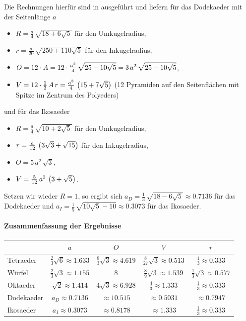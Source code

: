 \documentclass[11pt]{article}
\begin{document}
Die Rechnungen hierfür sind in \cite{Fendt1, Fendt2} ausgeführt und liefern
für das Dodekaeder mit der Seitenlänge $a$
\begin{itemize}
\item $R=\frac{a}{4}\,\sqrt{18+6\sqrt{5}}$ für den Umkugelradius,
\item $r=\frac{a}{20}\,\sqrt{250+110\sqrt{5}}$ für den Inkugelradius,
\item $O=12\cdot A=12\cdot\frac{a^2}{4}\,\sqrt{25+10\sqrt{5}}
  =3\,a^2\,\sqrt{25+10\sqrt{5}}$,
\item $V=12\cdot\frac13\,A\,r =\frac{a^3}{4}\,\left(15+7\sqrt{5}\right)$ (12 Pyramiden
  auf den Seitenflächen mit Spitze im Zentrum des Polyeders)
\end{itemize}
und für das Ikosaeder
\begin{itemize}
\item $R=\frac{a}{4}\,\sqrt{10+2\sqrt{5}}$ für den Umkugelradius,
\item $r=\frac{a}{12}\,\left(3\sqrt{3}+\sqrt{15}\right)$ für den Inkugelradius,
\item $O=5\,a^2\,\sqrt{3}$,
\item $V=\frac{5}{12}\,a^3\,\left(3+\sqrt{5}\right)$.
\end{itemize}
Setzen wir wieder $R=1$, so ergibt sich $a_D=\frac13\,\sqrt{18-6\sqrt{5}}
\approx 0.7136$ für das Dodekaeder und $a_I=\frac15\,\sqrt{10\sqrt{5}-10}
\approx 0.3073$ für das Ikosaeder. 

\paragraph{Zusammenfassung der Ergebnisse}
\begin{center}
  \begin{tabular}{|l|c|c|c|c|}\hline
    & $a$ & $O$ & $V$ & $r$ \\\hline
    Tetraeder & $\frac23\sqrt{6}\approx 1.633$ & $\frac83\sqrt{3} \approx
    4.619$ & $\frac{8}{27}\sqrt{3} \approx 0.513$ & $\frac13 \approx 0.333$\\ 
    Würfel & $\frac23\sqrt{3}\approx 1.155$ & $8$ & $\frac{8}{9}\sqrt{3}
    \approx 1.539$ & $\frac13\sqrt{3} \approx 0.577$ \\
    Oktaeder & $\sqrt{2}\approx 1.414$ & $4\sqrt{3}\approx 6.928$ &
    $\frac43 \approx 1.333$ & $\frac13 \approx 0.333$ \\
    Dodekaeder & $a_D\approx 0.7136$ & $\approx 10.515$ &
    $\approx 0.5031$ & $\approx 0.7947$ \\
    Ikosaeder & $a_I\approx 0.3073$ & $\approx 0.8178$ &
    $ \approx 1.333$ & $\frac13 \approx 0.333$ \\\hline
  \end{tabular}
\end{center}
\end{document}
